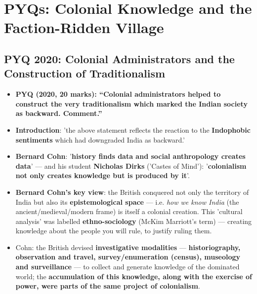 \chapter{PYQs: Colonial Knowledge and the Faction-Ridden Village}

\section{PYQ 2020: Colonial Administrators and the Construction of Traditionalism}

\begin{PYQLink}
\begin{itemize}
\item \textbf{PYQ (2020, 20 marks): ``Colonial administrators helped to construct the very traditionalism which marked the Indian society as backward. Comment.''}
\item \textbf{Introduction}: 'the above statement reflects the reaction to the \textbf{Indophobic sentiments} which had downgraded India as backward.'
\end{itemize}
\end{PYQLink}

\begin{KeyConcept}
\begin{itemize}
\item \textbf{Bernard Cohn}: '\textbf{history finds data and social anthropology creates data}' --- and his student \textbf{Nicholas Dirks} ('Castes of Mind'): '\textbf{colonialism not only creates knowledge but is produced by it}'.
\item \textbf{Bernard Cohn's key view}: the British conquered not only the territory of India but also its \textbf{epistemological space} --- i.e. \emph{how we know India} (the ancient/medieval/modern frame) is itself a colonial creation. This 'cultural analysis' was labelled \textbf{ethno-sociology} (McKim Marriott's term) --- creating knowledge about the people you will rule, to justify ruling them.
\item Cohn: the British devised \textbf{investigative modalities} --- \textbf{historiography, observation and travel, survey/enumeration (census), museology and surveillance} --- to collect and generate knowledge of the dominated world; the \textbf{accumulation of this knowledge, along with the exercise of power, were parts of the same project of colonialism}.
\end{itemize}
\end{KeyConcept}

